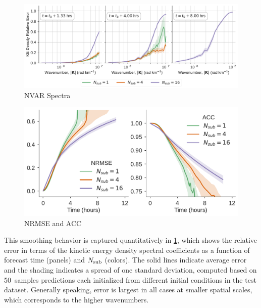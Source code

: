 \begin{figure}
    \centering
    \includegraphics[width=\textwidth]{../figures/nvar_ke_relerr.pdf}
    \caption{NVAR Spectra}
    \label{fig:nvar_spectra}
\end{figure}

\begin{figure}
    \centering
    \includegraphics[width=\textwidth]{../figures/nvar_rmse_and_acc.pdf}
    \caption{NRMSE and ACC}
    \label{fig:nvar_nrmse_and_acc}
\end{figure}

This smoothing behavior is captured quantitatively in \cref{fig:nvar_spectra},
which shows the relative error in terms of the kinetic energy density spectral
coefficients as a function of forecast time (panels) and $N_\text{sub}$ (colors).
The solid lines indicate average error and the shading indicates a spread of one
standard deviation, computed based on 50~samples predictions each initialized
from different initial conditions in the test dataset.
Generally speaking, error is largest in all cases at smaller spatial scales,
which corresponds to the higher wavenumbers.

